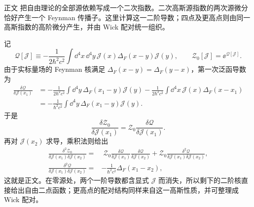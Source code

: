
\begin{derivation}

正文 把自由理论的全部源依赖写成一个二次指数。二次高斯源指数的两次源微分恰好产生一个 Feynman 传播子。这里计算这一二阶导数；四点及更高点则由同一高斯指数的高阶微分产生，并由 Wick 配对统一组织。

记
\begin{equation*}
 \mathscr Q[\mathcal J]
 \equiv
 -\frac{1}{2\hbar^2c^2}
 \int\dd^4 x\,\dd^4 y\,
 \mathcal J(x)\Delta_F(x-y)\mathcal J(y),
 \qquad
 \mathcal Z_0[\mathcal J]=\ee^{\mathscr Q[\mathcal J]}.
\end{equation*}
由于实标量场的 Feynman 核满足
$\Delta_F(x-y)=\Delta_F(y-x)$，第一次泛函导数为
\begin{align*}
 \frac{\delta\mathscr Q}{\delta\mathcal J(x_1)}
 &=-\frac{1}{2\hbar^2c^2}
 \int\dd^4 y\,\Delta_F(x_1-y)\mathcal J(y)
 -\frac{1}{2\hbar^2c^2}
 \int\dd^4 x\,\mathcal J(x)\Delta_F(x-x_1)\\
 &=-\frac{1}{\hbar^2c^2}
 \int\dd^4 y\,\Delta_F(x_1-y)\mathcal J(y).
\end{align*}
于是
\begin{equation*}
 \frac{\delta\mathcal Z_0}{\delta\mathcal J(x_1)}
 =\mathcal Z_0
 \frac{\delta\mathscr Q}{\delta\mathcal J(x_1)}.
\end{equation*}
再对 $\mathcal J(x_2)$ 求导，乘积法则给出
\begin{align*}
 \frac{\delta^2\mathcal Z_0}
 {\delta\mathcal J(x_1)\delta\mathcal J(x_2)}
 =&\;\mathcal Z_0
 \frac{\delta\mathscr Q}{\delta\mathcal J(x_1)}
 \frac{\delta\mathscr Q}{\delta\mathcal J(x_2)}
 +\mathcal Z_0
 \frac{\delta^2\mathscr Q}
 {\delta\mathcal J(x_1)\delta\mathcal J(x_2)},\\
 \frac{\delta^2\mathscr Q}
 {\delta\mathcal J(x_1)\delta\mathcal J(x_2)}
 =&-\frac{1}{\hbar^2c^2}\Delta_F(x_1-x_2),
\end{align*}
这就是正文。在零源处，两个一阶导数都含显式 $\mathcal J$ 而消失，所以剩下的二阶核直接给出自由二点函数；更高点的配对结构同样来自这一高斯性质，并可整理成 Wick 配对。
\end{derivation}
